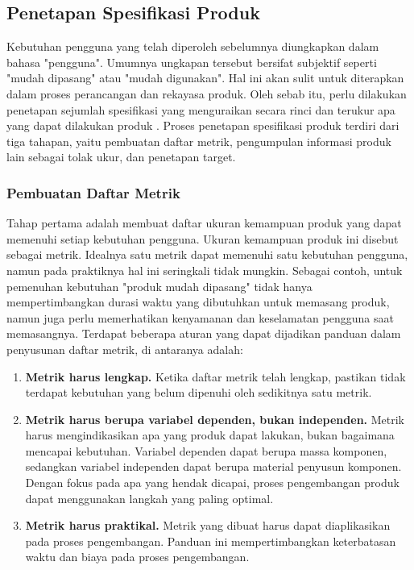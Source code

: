 
\subsection{Penetapan Spesifikasi Produk}
Kebutuhan pengguna yang telah diperoleh sebelumnya diungkapkan dalam bahasa "pengguna". Umumnya ungkapan tersebut bersifat subjektif seperti "mudah dipasang" atau "mudah digunakan". Hal ini akan sulit untuk diterapkan dalam proses perancangan dan rekayasa produk. Oleh sebab itu, perlu dilakukan penetapan sejumlah spesifikasi yang menguraikan secara rinci dan terukur apa yang dapat dilakukan produk \cite{bukuUlrich}. Proses penetapan spesifikasi produk terdiri dari tiga tahapan, yaitu pembuatan daftar metrik, pengumpulan informasi produk lain sebagai tolak ukur, dan penetapan target. \par
\subsubsection{Pembuatan Daftar Metrik}
Tahap pertama adalah membuat daftar ukuran kemampuan produk yang dapat memenuhi setiap kebutuhan pengguna. Ukuran kemampuan produk ini disebut sebagai metrik. Idealnya satu metrik dapat memenuhi satu kebutuhan pengguna, namun pada praktiknya hal ini seringkali tidak mungkin. Sebagai contoh, untuk pemenuhan kebutuhan "produk mudah dipasang" tidak hanya mempertimbangkan durasi waktu yang dibutuhkan untuk memasang produk, namun juga perlu memerhatikan kenyamanan dan keselamatan pengguna saat memasangnya. Terdapat beberapa aturan yang dapat dijadikan panduan dalam penyusunan daftar metrik, di antaranya adalah: \par
\begin{enumerate}
    \item \textbf{Metrik harus lengkap.} Ketika daftar metrik telah lengkap, pastikan tidak terdapat kebutuhan yang belum dipenuhi oleh sedikitnya satu metrik.
    \item \textbf{Metrik harus berupa variabel dependen, bukan independen.} Metrik harus mengindikasikan apa yang produk dapat lakukan, bukan bagaimana mencapai kebutuhan. Variabel dependen dapat berupa massa komponen, sedangkan variabel independen dapat berupa material penyusun komponen. Dengan fokus pada apa yang hendak dicapai, proses pengembangan produk dapat menggunakan langkah yang paling optimal.
    \newpage
    \item \textbf{Metrik harus praktikal.} Metrik yang dibuat harus dapat diaplikasikan pada proses pengembangan. Panduan ini mempertimbangkan keterbatasan waktu dan biaya pada proses pengembangan.
\end{enumerate}
